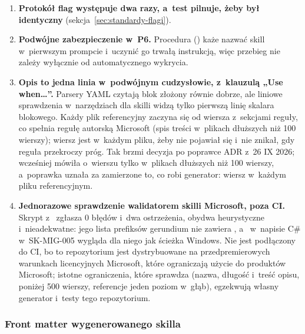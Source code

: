\begin{enumerate}
        z~reguł, więc nie mogą się rozjechać. Szablon musi zawierać obie i~może używać tylko
        znanych placeholderów.
  \item \textbf{Protokół flag występuje dwa razy, a~test pilnuje, żeby był identyczny}
        (sekcja~\ref{sec:standardy-flagi}).
  \item \textbf{Podwójne zabezpieczenie w~P6.} Procedura
        () każe nazwać skill w~pierwszym prompcie
        i~uczynić go trwałą instrukcją, więc przebieg nie zależy wyłącznie od automatycznego
        wykrycia.
  \item \textbf{Opis to jedna linia w~podwójnym cudzysłowie, z~klauzulą „Use when…”.}
        Parsery YAML czytają blok złożony równie dobrze, ale liniowe sprawdzenia w~narzędziach
        dla skilli widzą tylko pierwszą linię skalara blokowego. Każdy plik referencyjny
        zaczyna się od wiersza  z~sekcjami reguły, co spełnia regułę
        autorską Microsoft (spis treści w~plikach dłuższych niż 100 wierszy); wiersz jest
        w~każdym pliku, żeby nie pojawiał się i~nie znikał, gdy reguła przekroczy próg.
        Tak brzmi decyzja po poprawce ADR z~26 IX 2026; wcześniej mówiła o~wierszu
         tylko w~plikach dłuższych niż 100 wierszy, a~poprawka uznała za
        zamierzone to, co robi generator: wiersz w~każdym pliku referencyjnym.
  \item \textbf{Jednorazowe sprawdzenie walidatorem skilli Microsoft, poza CI.} Skrypt
         z~ zgłasza 0 błędów
        i~dwa ostrzeżenia, obydwa heurystyczne i~nieadekwatne: jego lista prefiksów gerundium
        nie zawiera , a~ w~napisie C\#
        w~SK-MIG-005 wygląda dla niego jak ścieżka Windows. Nie jest podłączony do CI, bo to
        repozytorium jest dystrybuowane na przedpremierowych warunkach licencyjnych Microsoft,
        które ograniczają użycie do produktów Microsoft; istotne ograniczenia, które sprawdza
        (nazwa, długość i~treść opisu,  poniżej 500 wierszy, referencje
        jeden poziom w~głąb), egzekwują własny generator i~testy tego repozytorium.
\end{enumerate}

\subsubsection{Front matter wygenerowanego skilla}

